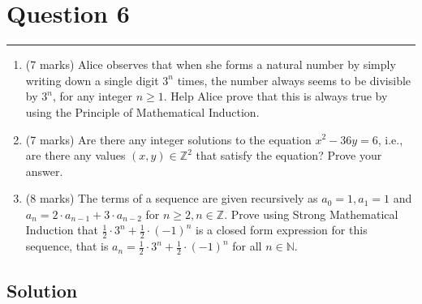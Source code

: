 \documentclass{article}
\begin{document}
\section*{Question 6}
\hrule
\vspace{0.5cm}

\begin{enumerate}[label=\alph*.]
    \item (7 marks) Alice observes that when she forms a natural number by simply writing down a single digit \( 3^n \) times, the number always seems to be divisible by \( 3^n \), for any integer \( n \geq 1 \). Help Alice prove that this is always true by using the Principle of Mathematical Induction.
    \item (7 marks) Are there any integer solutions to the equation \( x^2 - 36y = 6 \), i.e., are there any values \( (x, y) \in \mathbb{Z}^2 \) that satisfy the equation? Prove your answer.
    \item (8 marks) The terms of a sequence are given recursively as \( a_0 = 1, a_1 = 1 \) and \( a_n = 2 \cdot a_{n-1} + 3 \cdot a_{n-2} \) for \( n \geq 2, n \in \mathbb{Z} \). Prove using Strong Mathematical Induction that \( \frac12 \cdot 3^n + \frac12 \cdot (-1)^n \) is a closed form expression for this sequence, that is \( a_n = \frac12 \cdot 3^n + \frac12 \cdot (-1)^n \) for all \( n \in \mathbb{N} \).
\end{enumerate}

\subsection*{Solution}
\end{document}
